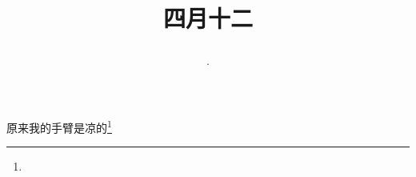 \title{\date[d=19,m=5,y=2024][year:cn-y,年,month:cn,day:cn,日,·,weekday]·四月十二 }
原来我的手臂是凉的\footnote{ }


